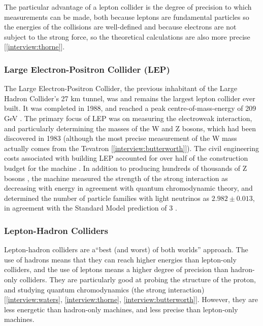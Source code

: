 The particular advantage of a lepton collider is the degree of precision to which measurements can be made, both because leptons are fundamental particles \textendash so the energies of the collisions are well-defined \textendash and because electrons are not subject to the strong force, so the theoretical calculations are also more precise [\ref{interview:thorne}].

\subsubsection{Large Electron-Positron Collider (LEP)}
The Large Electron-Positron Collider, the previous inhabitant of the Large Hadron Collider's 27 km tunnel, was and remains the largest lepton collider ever built. It was completed in 1988, and reached a peak centre-of-mass-energy of 209 GeV \cite{CERN:LEP:Online}. The primary focus of LEP was on measuring the electroweak interaction, and particularly determining the masses of the W and Z bosons, which had been discovered in 1983 (although the most precise measurement of the W mass actually comes from the Tevatron [\ref{interview:butterworth}]). The civil engineering costs associated with building LEP accounted for over half of the construction budget for the machine \cite{LEP:History:Online}. In addition to producing hundreds of thousands of Z bosons \cite{LEP:History:Online}, the machine measured the strength of the strong interaction as decreasing with energy in agreement with quantum chromodynamic theory, and determined the number of particle families with light neutrinos as $2.982\pm 0.013$, in agreement with the Standard Model prediction of 3 \cite{ALEPH:Physics:Online}.

\subsubsection{Lepton-Hadron Colliders}
Lepton-hadron colliders are a``best (and worst) of both worlds'' approach. The use of hadrons means that they can reach higher energies than lepton-only colliders, and the use of leptons means a higher degree of precision than hadron-only colliders. They are particularly good at probing the structure of the proton, and studying quantum chromodynamics (the strong interaction) [\ref{interview:waters}, \ref{interview:thorne}, \ref{interview:butterworth}]. However, they are less energetic than hadron-only machines, and less precise than lepton-only machines.

